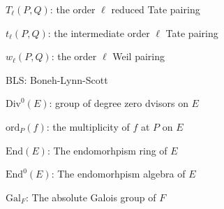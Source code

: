 \documentclass[11pt, lettersize, notitlepage, leqno, footskip=0.6cm]{article}
\newcommand{\absf}{\mathrm{Gal}_F}
\newcommand{\mr}{\mathrm}
\newcommand{\noin}{\noindent}
\newcommand{\End}{\mr{End}}
\numberwithin{equation}{section}
\begin{document}
\noin $T_{\ell}(P,Q)$: the order $\ell$ reduced Tate pairing \vspace{0.1cm}

\noin $t_{\ell}(P,Q)$: the intermediate order $\ell$ Tate pairing \vspace{0.1cm}

\noin $w_{\ell}(P,Q)$: the order $\ell$ Weil pairing  \vspace{0.1cm}

\noin BLS: Boneh-Lynn-Scott \vspace{0.1cm}

\noin $\mr{Div}^0(E)$: group of degree zero dvisors on $E$ \vspace{0.1cm}

\noin $\mr{ord}_P(f)$: the multiplicity of $f$ at $P$ on $E$ \vspace{0.1cm}

\noin $\End(E)$: The endomorhpism ring of $E$  \vspace{0.1cm}

\noin $\End^0(E)$: The endomorhpism algebra of $E$ \vspace{0.1cm}

\noin $\absf$: The absolute Galois group of $F$ \vspace{0.1cm}
\end{document}
